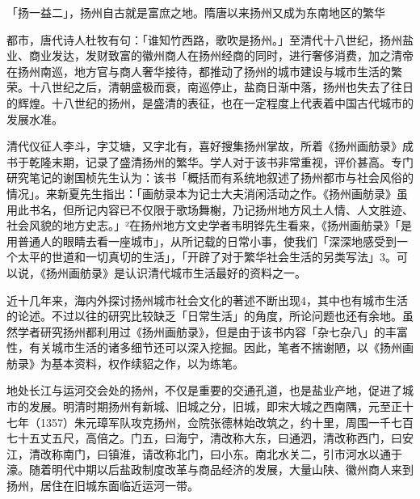 \begin{BookQuote}
「扬一益二」，扬州自古就是富庶之地。隋唐以来扬州又成为东南地区的繁华
\end{BookQuote}

都市，唐代诗人杜牧有句：「谁知竹西路，歌吹是扬州。」至清代十八世纪，扬州盐业、商业发达，发财致富的徽州商人在扬州经商的同时，进行奢侈消费，加之清帝在扬州南巡，地方官与商人奢华接待，都推动了扬州的城市建设与城市生活的繁荣。十八世纪之后，清朝盛极而衰，南巡停止，盐商日渐中落，扬州也失去了往日的辉煌。十八世纪的扬州，是盛清的表征，也在一定程度上代表着中国古代城市的发展水准。

清代仪征人李斗，字艾塘，又字北有，喜好搜集扬州掌故，所着《扬州画舫录》成书于乾隆末期，记录了盛清扬州的繁华。学人对于该书非常重视，评价甚高。专门研究笔记的谢国桢先生认为：该书「概括而有系统地叙述了扬州都市与社会风俗的情况」。来新夏先生指出：「画舫录本为记士大夫消闲活动之作。《扬州画舫录》虽用此书名，但所记内容已不仅限于歌场舞榭，乃记扬州地方风土人情、人文胜迹、社会风貌的地方史志。」²在扬州地方文史学者韦明铧先生看来，《扬州画舫录》「是用普通人的眼睛去看一座城市」，从所记载的日常小事，使我们「深深地感受到一个太平的世道和一切真切的生活」，「开辟了对于繁华社会生活的另类写法」3。可以说，《扬州画舫录》是认识清代城市生活最好的资料之一。

\vfill
\begin{BookNotes}
\end{BookNotes}

近十几年来，海内外探讨扬州城市社会文化的著述不断出现4，其中也有城市生活的论述。不过以往的研究比较缺乏「日常生活」的角度，所论问题也还有余地。虽然学者研究扬州都利用过《扬州画舫录》，但是由于该书内容「杂七杂八」的丰富性，有关城市生活的诸多细节还可以深入挖掘。因此，笔者不揣谢陋，以《扬州画舫录》为基本资料，权作续貂之作，以为练笔。


地处长江与运河交会处的扬州，不仅是重要的交通孔道，也是盐业产地，促进了城市的发展。明清时期扬州有新城、旧城之分，旧城，即宋大城之西南隅，元至正十七年（1357）朱元璋军队攻克扬州，佥院张德林始改筑之，约十里，周围一千七百七十五丈五尺，高倍之。门五，曰海宁，清改称大东，曰通泗，清改称西门，曰安江，清改称南门，曰镇淮，请改称北门，曰小东。南北水关二，引市河水以通于濠。随着明代中期以后盐政制度改革与商品经济的发展，大量山陕、徽州商人来到扬州，居住在旧城东面临近运河一带。

